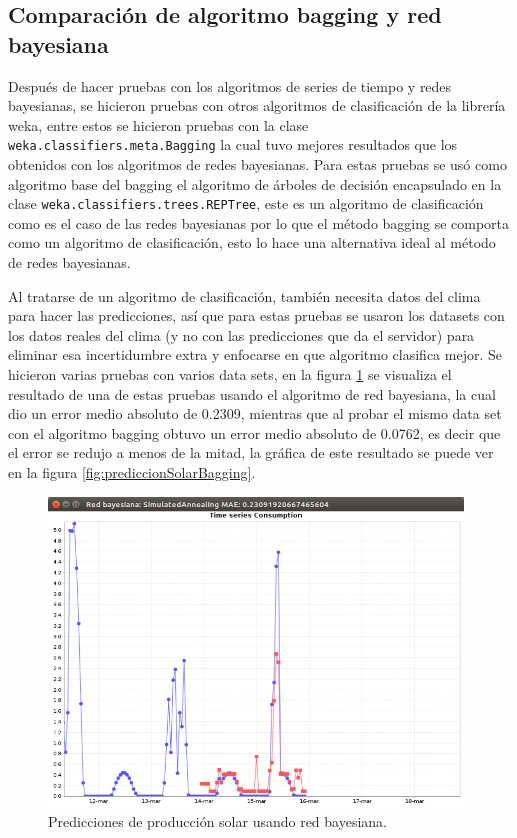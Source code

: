 \subsection{Comparación de algoritmo bagging y red bayesiana} \label{subsec:comparacionBaggingRedB}

Después de hacer pruebas con los algoritmos de series de tiempo y redes bayesianas, se hicieron pruebas con otros algoritmos de clasificación de la librería weka, entre estos se hicieron pruebas con la clase \texttt{weka.classifiers.meta.Bagging} la cual tuvo mejores resultados que los obtenidos con los algoritmos de redes bayesianas. %
Para estas pruebas se usó como algoritmo base del bagging el algoritmo de árboles de decisión encapsulado en la clase \texttt{weka.classifiers.trees.REPTree}, este es un algoritmo de clasificación como es el caso de las redes bayesianas por lo que el método bagging se comporta como un algoritmo de clasificación, esto lo hace una alternativa ideal al método de redes bayesianas.

Al tratarse de un algoritmo de clasificación, también necesita datos del clima para hacer las predicciones, así que para estas pruebas se usaron los datasets con los datos reales del clima (y no con las predicciones que da el servidor) para eliminar esa incertidumbre extra y enfocarse en que algoritmo clasifica mejor. 
Se hicieron varias pruebas con varios data sets, en la figura \ref{fig:prediccionSolarRedBayesiana} se visualiza el resultado de una de estas pruebas usando el algoritmo de red bayesiana, la cual dio un error medio absoluto de 0.2309, mientras que al probar el mismo data set con el algoritmo bagging obtuvo un error medio absoluto de 0.0762, es decir que el error se redujo a menos de la mitad, la gráfica de este resultado se puede ver en la figura \ref{fig:prediccionSolarBagging}.

\begin{figure}[h]
	\centering
	\includegraphics[width=11cm]{img/prediccionSolarRedBayesiana.png}
	\caption{Predicciones de producción solar usando red bayesiana.}
	\label{fig:prediccionSolarRedBayesiana}
\end{figure}

